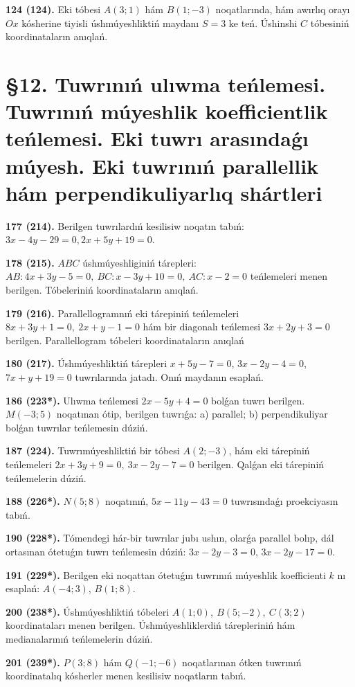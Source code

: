 \documentclass{article}
\begin{document}
\textbf{124 (124).} Eki tóbesi \(A(3;1)\) hám \(B(1;-3)\) noqatlarında, hám
awırlıq orayı $Ox$ kósherine tiyisli úshmúyeshliktiń maydanı
\(S=3\) ke teń. Úshinshi $C$ tóbesiniń koordinataların anıqlań.

\section*{\S 12. Tuwrınıń ulıwma teńlemesi. Tuwrınıń múyeshlik koefficientlik 
teńlemesi. Eki tuwrı arasındaǵı múyesh. Eki tuwrınıń parallellik hám 
perpendikuliyarlıq shártleri}

\textbf{177 (214).} Berilgen tuwrılardıń kesilisiw noqatın tabıń: 
\(3x-4y-29=0, 2x+5y+19=0\).

\textbf{178 (215).} $ABC$ úshmúyeshliginiń tárepleri: 
\(AB:4x+3y-5=0,\ BC:x-3y+10=0,\ AC:x-2=0
\) teńlemeleri menen berilgen. Tóbeleriniń koordinataların anıqlań.

\textbf{179 (216).} Parallellogramnıń eki tárepiniń teńlemeleri
\(8x+3y+1=0,\ 2x+y-1=0\) hám bir diagonalı teńlemesi
\(3x+2y+3=0\) berilgen. Parallellogram tóbeleri koordinataların
anıqlań

\textbf{180 (217).} Úshmúyeshliktiń tárepleri \(x+5y-7=0\),
\(3x-2y-4=0\), \(7x+y+19=0\) tuwrılarında jatadı. Onıń
maydanın esaplań.

\textbf{186 (223*).} Ulıwma teńlemesi \(2x-5y+4=0\) bolǵan tuwrı
berilgen. \(M(-3;5)\) noqatınan ótip, berilgen tuwrıǵa: a) parallel;
b) perpendikuliyar bolǵan tuwrılar teńlemesin dúziń.

\textbf{187 (224).} Tuwrımúyeshliktiń bir tóbesi \(A(2;-3)\), hám eki
tárepiniń teńlemeleri \(2x+3y+9=0,\ 3x-2y-7=0\)
berilgen. Qalǵan eki tárepiniń teńlemelerin dúziń.

\textbf{188 (226*).} \(N(5;8)\) noqatınıń, \(5x-11y-43=0\) tuwrısındaǵı
proekciyasın tabıń.

\textbf{190 (228*).} Tómendegi hár-bir tuwrılar jubı ushın, olarǵa parallel
bolıp, dál ortasınan ótetuǵın tuwrı teńlemesin dúziń: $3x-2y-3=0$, $3x-2y-17=0$.

\textbf{191 (229*).} Berilgen eki noqattan ótetuǵın tuwrınıń múyeshlik
koefficienti $k$ nı esaplań: $A(-4;3)$, $B(1;8)$.

\textbf{200 (238*).} Úshmúyeshliktiń tóbeleri \(A(1;0),\ B(5;-2),\ C(3;2)\)
koordinataları menen berilgen. Úshmúyeshliklerdiń tárepleriniń hám
medianalarınıń teńlemelerin dúziń.

\textbf{201 (239*).} \(P(3;8)\) hám \(Q(-1;-6)\) noqatlarınan ótken
tuwrınıń koordinatalıq kósherler menen kesilisiw noqatların tabıń.
\end{document}
